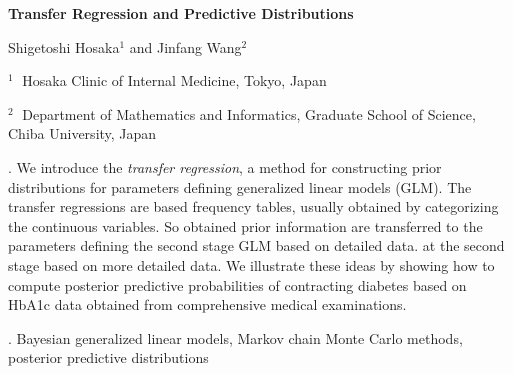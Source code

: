 \documentclass[12pt]{article}
\begin{document}
\begin{flushleft}


{\LARGE\bf Transfer Regression and Predictive Distributions}


\vspace{1.0cm}
Shigetoshi Hosaka$^1$
and
Jinfang Wang$^2$


\begin{description}
\item $^1 \;$ Hosaka Clinic of Internal Medicine, Tokyo, Japan
\item $^2 \;$ Department of Mathematics and Informatics, Graduate School of Science, Chiba University, Japan
\end{description}

\end{flushleft}


\vspace{0.75cm}

. 
We introduce the \textit{transfer regression}, a method for constructing prior distributions for parameters defining generalized linear models (GLM).
The transfer regressions are based frequency tables, usually obtained by categorizing the continuous variables.
So obtained prior information are transferred to the parameters defining the second stage GLM based on detailed data.
at the second stage based on more detailed data. 
We illustrate these ideas by showing how to compute posterior predictive probabilities of contracting diabetes based on HbA1c data obtained from comprehensive medical examinations. 

.
Bayesian generalized linear models, Markov chain Monte Carlo methods, posterior predictive distributions
\end{document}

